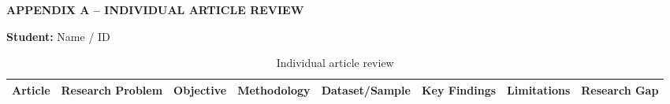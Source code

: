 \documentclass[12pt,a4paper]{article}
\begin{document}

\newpage

{}

\printbibliography[
    title={References}
]



\newpage
\begin{landscape}
\begin{flushleft}
    {\fontsize{14pt}{17pt}\selectfont
    \textbf{APPENDIX A -- INDIVIDUAL ARTICLE REVIEW}}
\end{flushleft}

\vspace{0.3cm}

\textbf{Student:} Name / ID
\begin{table}[H]
\caption{Individual article review}
\label{tab:individual-article-review}
\vspace{-0.2cm}
\fontsize{7.5pt}{9.5pt}\selectfont
\renewcommand{\arraystretch}{1.1}

\begin{tabularx}{\linewidth}{|>{\raggedright\arraybackslash}p{2.2cm}|>{\raggedright\arraybackslash}X|>{\raggedright\arraybackslash}X|>{\raggedright\arraybackslash}X|>{\raggedright\arraybackslash}X|>{\raggedright\arraybackslash}X|>{\raggedright\arraybackslash}X|>{\raggedright\arraybackslash}X|}
\hline

\textbf{Article} &
\textbf{Research Problem} &
\textbf{Objective} &
\textbf{Methodology} &
\textbf{Dataset/Sample} &
\textbf{Key Findings} &
\textbf{Limitations} &
\textbf{Research Gap}
\tabularnewline
\hline


\end{tabularx}
\end{table}
\end{landscape}
\end{document}
